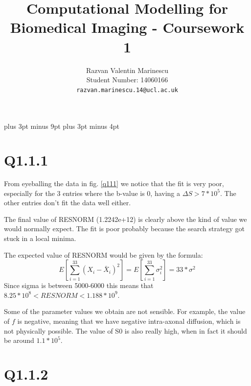 \documentclass[11pt,a4paper,oneside]{report}
\title{Computational Modelling for Biomedical Imaging - Coursework 1}
\author{
Razvan Valentin Marinescu\\
Student Number: 14060166\\
\texttt{razvan.marinescu.14@ucl.ac.uk}
}
\begin{document}
\belowdisplayskip=12pt plus 3pt minus 9pt
\belowdisplayshortskip=7pt plus 3pt minus 4pt
\maketitle{}

\section*{Q1.1.1}




From eyeballing the data in fig. \ref{q111} we notice that the fit is very poor, especially for the 3 entries where the b-value is 0, having a $\Delta S > 7 * 10^5$. The other entries don't fit the data well either.


The final value of RESNORM (1.2242e+12) is clearly above the kind of value we would normally expect. The fit is poor probably because the search strategy got stuck in a local minima.

 

The expected value of RESNORM would be given by the formula:
$$E\left[\sum_{i=1}^{33} (X_i - \bar{X}_i)^2\right] = E\left[\sum_{i=1}^{33} \sigma_i^2\right] = 33 * \sigma^2 $$
Since sigma is between 5000-6000 this means that $ 8.25*10^8 < RESNORM < 1.188 * 10^9$.


Some of the parameter values we obtain are not sensible. For example, the value of $f$ is negative, meaning that we have negative intra-axonal diffusion, which is not physically possible. The value of S0 is also really high, when in fact it should be around $1.1 * 10^5$. 


\section*{Q1.1.2}
\end{document}

